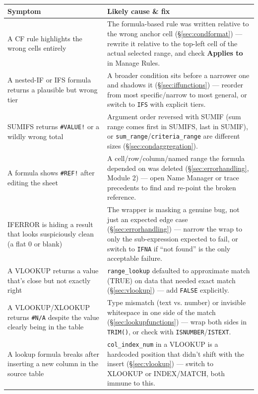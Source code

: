 \documentclass[11pt,a4paper]{article}
\begin{document}
\begin{center}
\small
\begin{tabular}{@{}L{3.8cm}L{8.2cm}@{}}
\toprule
\textbf{Symptom} & \textbf{Likely cause \& fix} \\
\midrule
A CF rule highlights the wrong cells entirely & The formula-based rule was written relative to the wrong anchor cell (\S\ref{sec:condformat}) --- rewrite it relative to the top-left cell of the actual selected range, and check \textbf{Applies to} in Manage Rules. \\
A nested-IF or IFS formula returns a plausible but wrong tier & A broader condition sits before a narrower one and shadows it (\S\ref{sec:iffunctions}) --- reorder from most specific/narrow to most general, or switch to \texttt{IFS} with explicit tiers. \\
SUMIFS returns \texttt{\#VALUE!} or a wildly wrong total & Argument order reversed with SUMIF (sum range comes first in SUMIFS, last in SUMIF), or \texttt{sum\_range}/\texttt{criteria\_range} are different sizes (\S\ref{sec:condaggregation}). \\
A formula shows \texttt{\#REF!} after editing the sheet & A cell/row/column/named range the formula depended on was deleted (\S\ref{sec:errorhandling}, Module 2) --- open Name Manager or trace precedents to find and re-point the broken reference. \\
IFERROR is hiding a result that looks suspiciously clean (a flat 0 or blank) & The wrapper is masking a genuine bug, not just an expected edge case (\S\ref{sec:errorhandling}) --- narrow the wrap to only the sub-expression expected to fail, or switch to \texttt{IFNA} if ``not found'' is the only acceptable failure. \\
A VLOOKUP returns a value that's close but not exactly right & \texttt{range\_lookup} defaulted to approximate match (TRUE) on data that needed exact match (\S\ref{sec:vlookup}) --- add \texttt{FALSE} explicitly. \\
A VLOOKUP/XLOOKUP returns \texttt{\#N/A} despite the value clearly being in the table & Type mismatch (text vs. number) or invisible whitespace in one side of the match (\S\ref{sec:lookupfunctions}) --- wrap both sides in \texttt{TRIM()}, or check with \texttt{ISNUMBER}/\texttt{ISTEXT}. \\
A lookup formula breaks after inserting a new column in the source table & \texttt{col\_index\_num} in a VLOOKUP is a hardcoded position that didn't shift with the insert (\S\ref{sec:vlookup}) --- switch to XLOOKUP or INDEX/MATCH, both immune to this. \\

\end{tabular}
\end{center}
\end{document}
